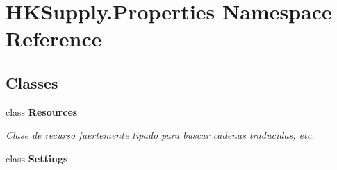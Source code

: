 \hypertarget{namespace_h_k_supply_1_1_properties}{}\section{H\+K\+Supply.\+Properties Namespace Reference}
\label{namespace_h_k_supply_1_1_properties}
\subsection*{Classes}
\begin{DoxyCompactItemize}
\item 
class {\bfseries Resources}
\begin{DoxyCompactList}\small\item\em Clase de recurso fuertemente tipado para buscar cadenas traducidas, etc. \end{DoxyCompactList}\item 
class {\bfseries Settings}
\end{DoxyCompactItemize}
